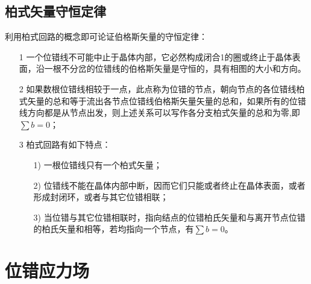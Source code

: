                \subsection{柏式矢量守恒定律}
                        利用柏式回路的概念即可论证伯格斯矢量的守恒定律：
                        \begin{enumerate}
                            \item[1] 一个位错线不可能中止于晶体内部，它必然构成闭合1的圈或终止于晶体表面，沿一根不分岔的位错线的伯格斯矢量是守恒的，具有相图的大小和方向。
                            \item[2] 如果数根位错线相较于一点，此点称为位错的节点，朝向节点的各位错线柏式矢量的总和等于流出各节点位错线伯格斯矢量矢量的总和，如果所有的位错线方向都是从节点出发，则上述关系可以写作各分支柏式矢量的总和为零,即$\sum b=0$；
                            \item[3] 柏式回路有如下特点：
                            \begin{enumerate}
                                \item[1)] 一根位错线只有一个柏式矢量；
                                \item[2)] 位错线不能在晶体内部中断，因而它们只能或者终止在晶体表面，或者形成封闭环，或者与其它位错相联；
                                \item[3)] 当位错与其它位错相联时，指向结点的位错柏氏矢量和与离开节点位错的柏氏矢量和相等，若均指向一个节点，有$\sum b=0$。
                            \end{enumerate} 
                        \end{enumerate}
        
        \section{位错应力场}
            